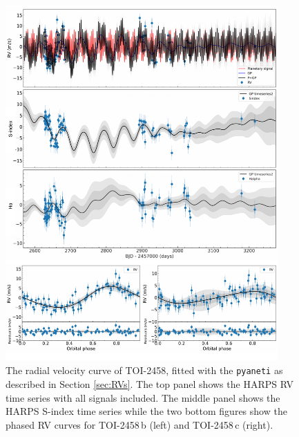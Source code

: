 \documentclass[traditabstract,longauth]{aa}
\begin{document}

\begin{figure}
\centering
\includegraphics[width=0.93\textwidth]{figures/RVs_plots_v3.pdf}
\caption{The radial velocity curve of TOI-2458, fitted with the {\tt pyaneti} as described in Section \ref{sec:RVs}. The top panel shows the HARPS RV time series with all signals included. The middle panel shows the HARPS S-index time series while the two bottom figures show the phased RV curves for TOI-2458\,b (left) and TOI-2458\,c (right).} \label{fig:RVs}
\end{figure}
\end{document}
